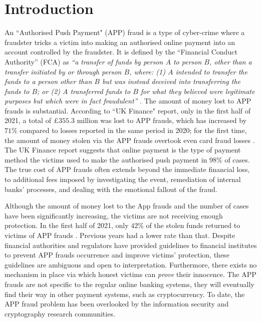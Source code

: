 

\section{Introduction}

An  ``Authorised Push Payment" (APP) fraud is a type of cyber-crime where a fraudster tricks a victim into making an authorised online payment into an account controlled by the fraudster. It is defined by the ``Financial Conduct Authority” (FCA) as \textit{``a transfer of funds by person $A$ to person $B$, other than a transfer initiated by or through person $B$, where: (1) $A$ intended to transfer the funds to a person other than $B$ but was instead deceived into transferring the funds to $B$; or (2) A transferred funds to $B$ for what they believed were legitimate purposes but which were in fact fraudulent''} \cite{FCA-Glossary}. The amount of money lost to  APP frauds is   substantial. According to  ``UK Finance" report,   only in the first half of 2021, a total of £$355.3$ million was lost to APP frauds, which has increased by  $71\%$  compared to losses reported in the same period in 2020; for the first time, the amount of money stolen via the APP frauds overtook even   card fraud losses \cite{2021-Half-Year-Fraud-Update}. The UK Finance report suggests that  online  payment is the type of payment method the victims used to make the authorised push payment in  $98\%$  of cases. The true cost of APP frauds often extends beyond the immediate financial loss,  to additional fees imposed by  investigating the event, remediation of internal banks' processes, and  dealing with the emotional fallout of the fraud. %


Although the amount of money lost to the App frauds and the number of cases have been significantly  increasing, the victims are not receiving  enough protection.   In the first half of 2021, only $42\%$ of the stolen funds returned to victims of  APP frauds \cite{2021-Half-Year-Fraud-Update}. Previous years had a lower rate than that. Despite   financial authorities and regulators have provided  guidelines to financial institutes to prevent  APP frauds occurrence and improve victims' protection, these guidelines are  ambiguous and    open to interpretation. Furthermore,  there exists  no  mechanism in place via which honest victims can  \emph{prove} their innocence. The APP frauds are not specific to the regular online banking systems, they will eventually find their way in other payment systems, such as cryptocurrency. To date, the APP fraud problem has been overlooked by the information security and cryptography research communities.


